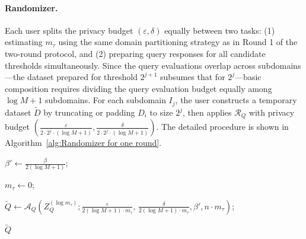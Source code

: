 \paragraph{Randomizer.} 
Each user splits the privacy budget $(\varepsilon, \delta)$ equally between two tasks: 
(1) estimating $m_\tau$ using the same domain partitioning strategy as in Round 1 of the two-round protocol, and 
(2) preparing query responses for all candidate thresholds simultaneously.
Since the query evaluations overlap across subdomains---the dataset prepared for threshold $2^{j+1}$ subsumes that for $2^j$---basic composition requires dividing the query evaluation budget equally among $\log M+1$ subdomains.
For each subdomain $I_j$, the user constructs a temporary dataset $\tilde{D}$ by truncating or padding $D_i$ to size $2^j$, then applies $\mathcal{R}_Q$ with privacy budget $(\frac{\varepsilon}{2 \cdot 2^j \cdot (\log M + 1)},\frac{\delta}{2 \cdot 2^j \cdot (\log M + 1)})$.
The detailed procedure is shown in Algorithm~\ref{alg:Randomizer for one round}.

\begin{algorithm}[t]
\caption{Analyzer} 
\label{alg:Analyzer for One round}


$\beta' \leftarrow \frac{\beta}{2(\log M+1)}$;

$m_\tau \leftarrow 0$;


$\tilde{Q} \gets \mathcal{A}_Q(Z_Q^{(\log m_\tau)}; \frac{\varepsilon}{2 (\log M+1) \cdot m_\tau},\, \frac{\delta}{2 (\log M+1) \cdot m_\tau},\beta',  n\cdot m_\tau)$;

\Return $\tilde{Q}$

\end{algorithm}


